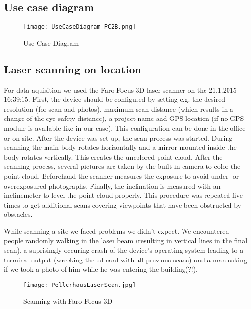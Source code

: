 \pagebreak

\subsection{Use case diagram}

\begin{figure}[h]
	\centering
	\texttt{[image: UseCaseDiagram\_PC2B.png]}
	\caption{Use Case Diagram}
	\label{fig:use_case}
\end{figure}


\subsection{Laser scanning on location}

For data aquisition we used the Faro Focus 3D laser scanner on the 21.1.2015 16:39:15. First, the device should be configured by setting e.g. the desired resolution (for scan and photos), maximum scan distance (which results in a change of the eye-safety distance), a project name and GPS location (if no GPS module is available like in our case). This configuration can be done in the office or on-site. After the device was set up, the scan process was started. During scanning the main body rotates horizontally and a mirror mounted inside the body rotates vertically. This creates the uncolored point cloud. After the scanning process, several pictures are taken by the built-in camera to color the point cloud. Beforehand the scanner measures the exposure to avoid under- or overexposured photographs. Finally, the inclination is measured with an inclinometer to level the point cloud properly.
This procedure was repeated five times to get additional scans covering viewpoints that have been obstructed by obstacles.

While scanning a site we faced problems we didn't expect. We encountered people randomly walking in the laser beam (resulting in vertical lines in the final scan), a suprisingly occuring crash of the device's operating system leading to a terminal output (wrecking the sd card with all previous scans) and a man asking if we took a photo of him while he was entering the building(?!).


\begin{figure}[h]
	\centering
	\texttt{[image: PellerhausLaserScan.jpg]}
	\caption{Scanning with Faro Focus 3D}
	\label{fig:laser_scanning_on_location}
\end{figure}


\pagebreak


